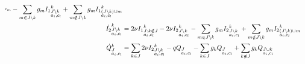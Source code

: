 \documentclass{beamer}
\begin{document}
\begin{frame}
\begin{tiny}
\begin{align}
{\begin{subarray}{l}
    c_m \end{subarray}}  -\sum_{m
  \in J \setminus k} g_m {I_1}^k_{\begin{subarray}{l}J \setminus k\\ a_i, c_l \end{subarray}} + \sum_{m
  \notin J \setminus k} g_m {I_1}^k_{\begin{subarray}{l} (J \setminus k) \cup m \\ a_i, c_l \end{subarray}}  \notag \\
\dot{I_2}^k_{\begin{subarray}{l}J \setminus k\\ a_i,
    c_l \end{subarray}} &=2 \nu {I_1}^k_{\begin{subarray}{l}J:k
    \notin J\\ a_i, c_l \end{subarray}} -2 \nu {I_2}^k_{\begin{subarray}{l}J \setminus k\\ a_i, c_l \end{subarray}} -\sum_{m
  \in J \setminus k} g_m {I_2}^k_{\begin{subarray}{l}J \setminus k\\ a_i, c_l \end{subarray}} + \sum_{m
  \notin J \setminus k} g_m {I_2}^k_{\begin{subarray}{l} (J \setminus k) \cup m \\ a_i, c_l \end{subarray}} 
\notag \\
\dot{Q}^k_{\begin{subarray}{l}J \\ a_i, c_l \end{subarray}}
&= \sum_{k \in J} 2 \nu {I_2}^k_{\begin{subarray}{l}J \setminus k\\
    a_i,
    c_l \end{subarray}} - q Q_{\begin{subarray}{l}J \\
    a_i, c_l \end{subarray}} -\sum_{k \in J} g_k
Q_{\begin{subarray}{l}J\\ a_i, c_l \end{subarray}} + \sum_{k \notin J}
g_k Q_{\begin{subarray}{l}J \cup k \\ a_i, c_l \end{subarray}} \notag
\end{align}
\end{tiny}

\end{frame}
\end{document}
